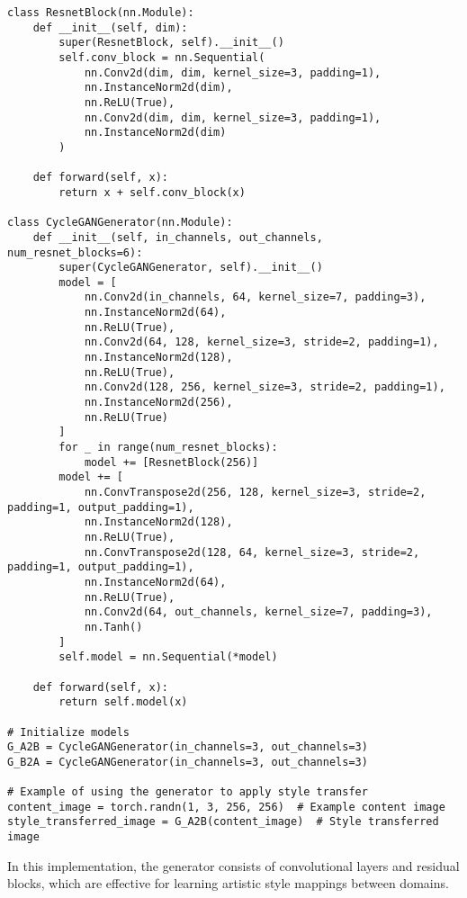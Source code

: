 \begin{lstlisting}[style=python]
class ResnetBlock(nn.Module):
    def __init__(self, dim):
        super(ResnetBlock, self).__init__()
        self.conv_block = nn.Sequential(
            nn.Conv2d(dim, dim, kernel_size=3, padding=1),
            nn.InstanceNorm2d(dim),
            nn.ReLU(True),
            nn.Conv2d(dim, dim, kernel_size=3, padding=1),
            nn.InstanceNorm2d(dim)
        )

    def forward(self, x):
        return x + self.conv_block(x)

class CycleGANGenerator(nn.Module):
    def __init__(self, in_channels, out_channels, num_resnet_blocks=6):
        super(CycleGANGenerator, self).__init__()
        model = [
            nn.Conv2d(in_channels, 64, kernel_size=7, padding=3),
            nn.InstanceNorm2d(64),
            nn.ReLU(True),
            nn.Conv2d(64, 128, kernel_size=3, stride=2, padding=1),
            nn.InstanceNorm2d(128),
            nn.ReLU(True),
            nn.Conv2d(128, 256, kernel_size=3, stride=2, padding=1),
            nn.InstanceNorm2d(256),
            nn.ReLU(True)
        ]
        for _ in range(num_resnet_blocks):
            model += [ResnetBlock(256)]
        model += [
            nn.ConvTranspose2d(256, 128, kernel_size=3, stride=2, padding=1, output_padding=1),
            nn.InstanceNorm2d(128),
            nn.ReLU(True),
            nn.ConvTranspose2d(128, 64, kernel_size=3, stride=2, padding=1, output_padding=1),
            nn.InstanceNorm2d(64),
            nn.ReLU(True),
            nn.Conv2d(64, out_channels, kernel_size=7, padding=3),
            nn.Tanh()
        ]
        self.model = nn.Sequential(*model)

    def forward(self, x):
        return self.model(x)

# Initialize models
G_A2B = CycleGANGenerator(in_channels=3, out_channels=3)
G_B2A = CycleGANGenerator(in_channels=3, out_channels=3)

# Example of using the generator to apply style transfer
content_image = torch.randn(1, 3, 256, 256)  # Example content image
style_transferred_image = G_A2B(content_image)  # Style transferred image
\end{lstlisting}

In this implementation, the generator consists of convolutional layers and residual blocks, which are effective for learning artistic style mappings between domains.

